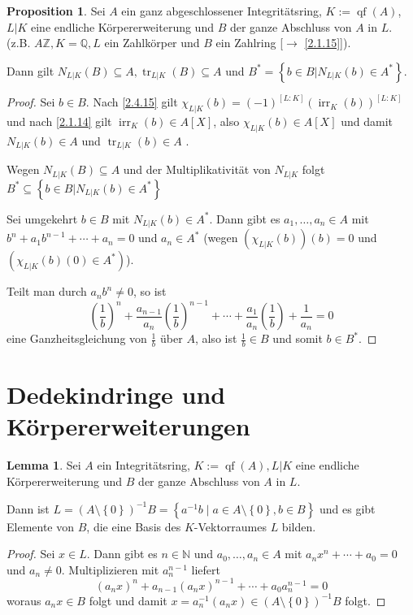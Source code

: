 \documentclass[
twoside=semi,
fontsize=12,
DIV=12, 
cleardoublepage=current,
leqno,
headings=optiontoheadandtoc, 
toc=idx
]{scrbook}
\newcommand{\N}{\mathbb{N}}
\newcommand{\Z}{\mathbb{Z}}
\newcommand{\Q}{\mathbb{Q}}
\newcommand{\brac}[1]{\left( #1 \right)}
\newcommand{\set}[1]{\left\{ #1 \right\}}
\DeclareMathOperator{\qf}{qf}
\DeclareMathOperator{\irr}{irr}
\DeclareMathOperator{\tr}{tr}
\theoremstyle{definition}
\newtheorem{lemma}[definition]{Lemma}
\newtheorem{proposition}[definition]{Proposition}
\begin{document}
 	\begin{proposition}\label{2.4.25}\hfill\newline
 		Sei $A$ ein ganz abgeschlossener Integrit\"atsring, $K:=\qf(A)$, $L|K$ eine endliche K\"orpererweiterung und $B$ der ganze Abschluss von $A$ in $L$.
 		(z.B. $A \Z, K = \Q, L$ ein Zahlk\"orper und $B$ ein Zahlring [$\to$ \ref{2.1.15}]).
 		
 		Dann gilt $N_{L|K}(B) \subseteq A, \tr_{L|K}(B) \subseteq A$ und $B^* = \set{b \in B| N_{L|K}(b) \in A^*}$.
 		
 		\begin{proof}
 			Sei $b \in B$. Nach \ref{2.4.15} gilt $\chi_{L|K}(b) = (-1)^{[L:K]}(\irr_K(b))^{[L:K]}$ und nach \ref{2.1.14} gilt $\irr_K(b) \in A[X]$, also $\chi_{L|K}(b) \in A[X]$ und damit
 			$N_{L|K}(b) \in A$ und $\tr_{L|K}(b) \in A$ \newline [$\to$ \ref{2.4.1}].
 			
 			Wegen $N_{L|K}(B) \subseteq A$ und der Multiplikativit\"at von $N_{L|K}$ folgt $B^* \subseteq \set{b \in B| N_{L|K}(b) \in A^*}$
 			
 			Sei umgekehrt $b \in B$ mit $N_{L|K}(b) \in A^*$. Dann gibt es $a_1, \dots, a_n \in A$ mit \linebreak $b^n + a_1b^{n-1} + \cdots + a_n = 0$ und
 			$a_n \in A^*$ (wegen $(\chi_{L|K}(b))(b) = 0$ und $(\chi_{L|K}(b)(0) \in A^*)$).
 			
 			Teilt man durch $a_nb^n \neq 0$, so ist 
 				\[\brac{\frac{1}{b}}^n + \frac{a_{n-1}}{a_n}\brac{\frac{1}{b}}^{n-1} + \cdots + \frac{a_1}{a_n}\brac{\frac{1}{b}} + \frac{1}{a_n} = 0\]
 			eine Ganzheitsgleichung von $\frac{1}{b}$ \"uber $A$, also ist $\frac{1}{b} \in B$ und somit $b \in B^*$. 
 		\end{proof}
 	\end{proposition}
 
 	\newpage
 	\section{Dedekindringe und K\"orpererweiterungen}\thispagestyle{sectionstart}
 	\begin{lemma}\label{2.5.1}\hfill\newline
 		Sei $A$ ein Integrit\"atsring, $K:= \qf(A), L|K$ eine endliche K\"orpererweiterung und $B$ der ganze Abschluss von $A$ in $L$.
 		
 		\medskip\noindent 
 		Dann ist $L = \brac{A\setminus \set{0}}^{-1} B = \set{a^{-1}b \mid a \in A \setminus \set{0}, b \in B}$ und es gibt Elemente von $B$, die eine Basis des $K$-Vektorraumes $L$ bilden.
 		
 		\begin{proof}
 			Sei $x \in L$. Dann gibt es $n \in \N$ und $a_0, \dots, a_n \in A$ mit $a_nx^n + \cdots + a_0 = 0$ und $a_n \neq 0$. Multiplizieren mit $a_n^{n-1}$ liefert
 				\[(a_nx)^n + a_{n-1}(a_nx)^{n-1} + \cdots + a_0a_n^{n-1} = 0\]
 			woraus $a_nx \in B$ folgt und damit $x = a_n^{-1}(a_nx) \in \brac{A \setminus \set{0}}^{-1}B$ folgt.
 		\end{proof} 
 	\end{lemma}
 	
\end{document}
